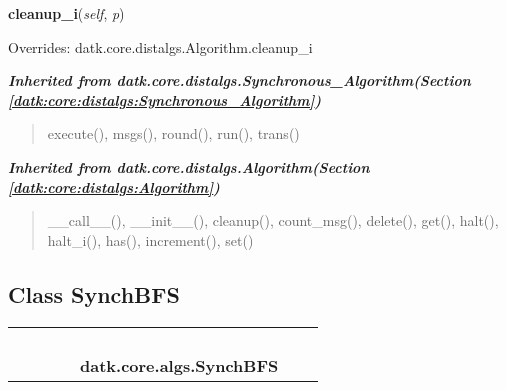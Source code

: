     \vspace{0.5ex}

\hspace{.8\funcindent}\begin{boxedminipage}{\funcwidth}

    \raggedright \textbf{cleanup\_i}(\textit{self}, \textit{p})

\setlength{\parskip}{2ex}
\setlength{\parskip}{1ex}
      Overrides: datk.core.distalgs.Algorithm.cleanup\_i

    \end{boxedminipage}


\large{\textbf{\textit{Inherited from datk.core.distalgs.Synchronous\_Algorithm\textit{(Section \ref{datk:core:distalgs:Synchronous_Algorithm})}}}}

\begin{quote}
execute(), msgs(), round(), run(), trans()
\end{quote}

\large{\textbf{\textit{Inherited from datk.core.distalgs.Algorithm\textit{(Section \ref{datk:core:distalgs:Algorithm})}}}}

\begin{quote}
\_\_call\_\_(), \_\_init\_\_(), cleanup(), count\_msg(), delete(), get(), halt(), halt\_i(), has(), increment(), set()
\end{quote}


\subsection{Class SynchBFS}

    \label{datk:core:algs:SynchBFS}
\begin{tabular}{cccccccc}
\multicolumn{2}{r}{\settowidth{\BCL}{datk.core.distalgs.Algorithm}\multirow{2}{\BCL}{datk.core.distalgs.Algorithm}}
&&
&&
  \\\cline{3-3}
  &&\multicolumn{1}{c|}{}
&&
&&
  \\
\multicolumn{4}{r}{\settowidth{\BCL}{datk.core.distalgs.Synchronous\_Algorithm}\multirow{2}{\BCL}{datk.core.distalgs.Synchronous\_Algorithm}}
&&
  \\\cline{5-5}
  &&&&\multicolumn{1}{c|}{}
&&
  \\
&&&&\multicolumn{2}{l}{\textbf{datk.core.algs.SynchBFS}}
\end{tabular}

